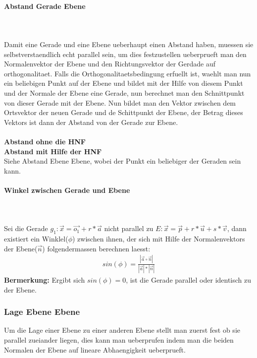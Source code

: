 \documentclass[a4paper]{article} %
\begin{document}
	\paragraph{Abstand Gerade Ebene}
	\hspace{0 cm} \\ \noindent \\
	Damit eine Gerade und eine Ebene ueberhaupt einen Abstand haben, muessen sie selbstverstaendlich echt parallel sein,
	um dies festzustellen ueberprueft man den Normalenvektor der Ebene und den Richtungsvektor der Gerdade auf orthogonalitaet.
	Falls die Orthogonalitaetsbedingung erfuellt ist, waehlt man nun ein beliebigen Punkt auf der Ebene und bildet mit der Hilfe von
	diesem Punkt und der Normale der Ebene eine Gerade, nun berechnet man den Schnittpunkt von dieser Gerade mit der Ebene.
	Nun bildet man den Vektor zwischen dem Ortsvektor der neuen Gerade und de Schittpunkt der Ebene, der Betrag dieses Vektors
	ist dann der Abstand von der Gerade zur Ebene.\\\\
	\textbf{Abstand ohne die HNF}\\
	\textbf{Abstand mit Hilfe der HNF}\\
	Siehe Abstand Ebene Ebene, wobei der Punkt ein beliebiger der Geraden sein kann.

	\paragraph{Winkel zwischen Gerade und Ebene}
	\hspace{0 cm} \\ \noindent \\
	Sei die Gerade $g_1: \vec{x}= \vec{o_1}+r*\vec{a}$ nicht parallel zu $E : \vec{x} = \vec{p}+ r*\vec{u}+s*\vec{v}$, dann existiert ein Winklel($\phi$) zwischen ihnen, der sich mit Hilfe der Normalenvektors der Ebene($\vec{n}$) folgendermassen berechnen laesst:
	\begin{align*}
		sin(\phi)= \frac{|\vec{a} \circ \vec{n}|}{|\vec{a}|*|\vec{n}|}
	\end{align*}
	\textbf{Bermerkung:}
	Ergibt sich $sin(\phi)=0$, ist die Gerade parallel oder identisch zu der Ebene.
	\subsubsection{Lage Ebene Ebene}
	Um die Lage einer Ebene zu einer anderen Ebene stellt man zuerst fest ob sie parallel zueiander liegen, dies kann man ueberprufen indem man die beiden Normalen der Ebene auf lineare Abhaengigkeit ueberprueft.
\end{document}
